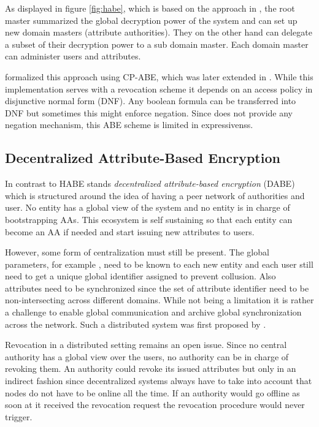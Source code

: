 As displayed in figure \ref{fig:habe}, which is based on the approach in \cite{wang2011hierarchical}, the root master summarized the global decryption power of the system and can set up new domain masters (attribute authorities). They on the other hand can delegate a subset of their decryption power to a sub domain master. Each domain master can administer users and attributes.

\cite{Wang:2010:HAE:1866307.1866414} formalized this approach using \ac{CP-ABE}, which was later extended in \cite{wang2011hierarchical}. While this implementation serves with a revocation scheme it depends on an access policy in disjunctive normal form (\ac{DNF}). Any boolean formula can be transferred into DNF but sometimes this might enforce negation. Since \cite{wang2011hierarchical} does not provide any negation mechanism, this ABE scheme is limited in expressivenss.

\subsection{Decentralized Attribute-Based Encryption}
\label{sec:DABE}
In contrast to HABE stands \textit{decentralized attribute-based encryption} (\ac{DABE}) which is structured around the idea of having a peer network of authorities and user. No entity has a global view of the system and no entity is in charge of bootstrapping AAs. This ecosystem is self sustaining so that each entity can become an \ac{AA} if needed and start issuing new attributes to users. 

However, some form of centralization must still be present. The global parameters, for example , need to be known to each new entity and each user still need to get a unique global identifier assigned to prevent collusion. Also attributes need to be synchronized since the set of attribute identifier need to be non-intersecting across different domains. While not being a limitation it is rather a challenge to enable global communication and archive global synchronization across the network. Such a distributed system was first proposed by \cite{lewko2011decentralizing}. 

Revocation in a distributed setting remains an open issue. Since no central authority has a global view over the users, no authority can be in charge of revoking them. An authority could revoke its issued attributes but only in an indirect fashion since decentralized systems always have to take into account that nodes do not have to be online all the time. If an authority would go offline as soon at it received the revocation request the revocation procedure would never trigger. 

